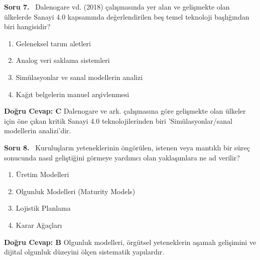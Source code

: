 \documentclass[11pt,a4paper,openany]{book}
\begin{document}
\needspace{5cm}
\vspace{8pt}
\noindent\textbf{\large\sffamily Soru 7.} \ Dalenogare vd. (2018) çalışmasında yer alan ve gelişmekte olan ülkelerde Sanayi 4.0 kapsamında değerlendirilen beş temel teknoloji başlığından biri hangisidir?
\begin{enumerate}[label=\Alph*), leftmargin=25pt, topsep=4pt, itemsep=2pt]
    \item Geleneksel tarım aletleri
    \item Analog veri saklama sistemleri
    \item Simülasyonlar ve sanal modellerin analizi
    \item Kağıt belgelerin manuel arşivlenmesi
\end{enumerate}
\vspace{4pt}
\begin{tcolorbox}[title=Cevap ve Açıklama, colback=gray!3!white, colframe=primarycolor!90!black, arc=2mm, fonttitle=\bfseries\sffamily, top=6pt, bottom=6pt]
    \textbf{Doğru Cevap: C}
    \vspace{2pt}
    Dalenogare ve ark. çalışmasına göre gelişmekte olan ülkeler için öne çıkan kritik Sanayi 4.0 teknolojilerinden biri 'Simülasyonlar/sanal modellerin analizi'dir.
\end{tcolorbox}
\vspace{10pt}

\needspace{5cm}
\vspace{8pt}
\noindent\textbf{\large\sffamily Soru 8.} \ Kuruluşların yeteneklerinin öngörülen, istenen veya mantıklı bir süreç sonucunda nasıl geliştiğini görmeye yardımcı olan yaklaşımlara ne ad verilir?
\begin{enumerate}[label=\Alph*), leftmargin=25pt, topsep=4pt, itemsep=2pt]
    \item Üretim Modelleri
    \item Olgunluk Modelleri (Maturity Models)
    \item Lojistik Planlama
    \item Karar Ağaçları
\end{enumerate}
\vspace{4pt}
\begin{tcolorbox}[title=Cevap ve Açıklama, colback=gray!3!white, colframe=primarycolor!90!black, arc=2mm, fonttitle=\bfseries\sffamily, top=6pt, bottom=6pt]
    \textbf{Doğru Cevap: B}
    \vspace{2pt}
    Olgunluk modelleri, örgütsel yeteneklerin aşamalı gelişimini ve dijital olgunluk düzeyini ölçen sistematik yapılardır.
\end{tcolorbox}
\vspace{10pt}
\end{document}
